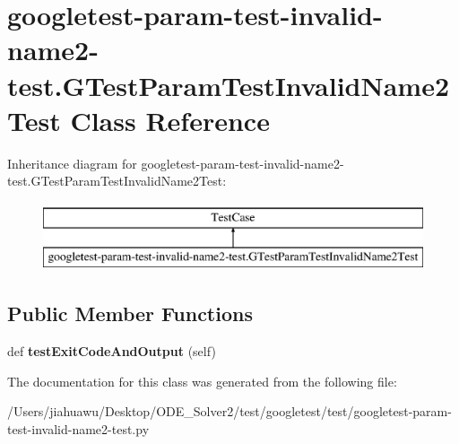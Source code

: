 \hypertarget{classgoogletest-param-test-invalid-name2-test_1_1_g_test_param_test_invalid_name2_test}{}\section{googletest-\/param-\/test-\/invalid-\/name2-\/test.G\+Test\+Param\+Test\+Invalid\+Name2\+Test Class Reference}
\label{classgoogletest-param-test-invalid-name2-test_1_1_g_test_param_test_invalid_name2_test}
Inheritance diagram for googletest-\/param-\/test-\/invalid-\/name2-\/test.G\+Test\+Param\+Test\+Invalid\+Name2\+Test\+:\begin{figure}[H]
\begin{center}
\leavevmode
\includegraphics[height=2.000000cm]{classgoogletest-param-test-invalid-name2-test_1_1_g_test_param_test_invalid_name2_test}
\end{center}
\end{figure}
\subsection*{Public Member Functions}
\begin{DoxyCompactItemize}
\item 
\mbox{\label{classgoogletest-param-test-invalid-name2-test_1_1_g_test_param_test_invalid_name2_test_a3fbc22a46315dc7ba10f0203349de7c7}} 
def {\bfseries test\+Exit\+Code\+And\+Output} (self)
\end{DoxyCompactItemize}


The documentation for this class was generated from the following file\+:\begin{DoxyCompactItemize}
\item 
/\+Users/jiahuawu/\+Desktop/\+O\+D\+E\+\_\+\+Solver2/test/googletest/test/googletest-\/param-\/test-\/invalid-\/name2-\/test.\+py\end{DoxyCompactItemize}
